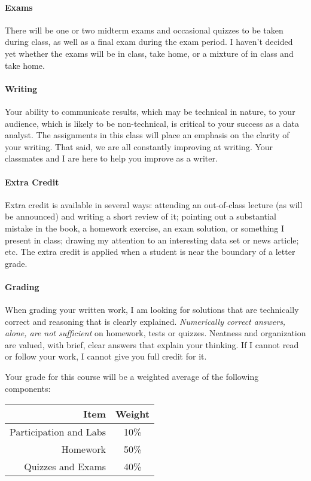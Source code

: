 \documentclass[11pt]{article}
\begin{document}
\paragraph{Exams}
There will be one or two midterm exams and occasional quizzes to be taken during class, as well as a final exam during the exam period.  I haven't decided yet whether the exams will be in class, take home, or a mixture of in class and take home.

\paragraph{Writing}
Your ability to communicate results, which may be technical in nature, to your audience, which is likely to be non-technical, is critical to your success as a data analyst. The assignments in this class will place an emphasis on the clarity of your writing.  That said, we are all constantly improving at writing.  Your classmates and I are here to help you improve as a writer.

\paragraph{Extra Credit}
Extra credit is available in several ways: attending an out-of-class lecture (as will be announced) and writing a short review of it; pointing out a substantial mistake in the book, a homework exercise, an exam solution, or something I present in class; drawing my attention to an interesting data set or news article; etc. The extra credit is applied when a student is near the boundary of a letter grade.

\paragraph{Grading}
When grading your written work, I am looking for solutions that are technically correct and reasoning that is clearly explained.  \emph{Numerically correct answers, alone, are not sufficient} on homework, tests or quizzes.  Neatness and organization are valued, with brief, clear answers that explain your thinking.  If I cannot read or follow your work, I cannot give you full credit for it.

Your grade for this course will be a weighted average of the following components:


\begin{table}[!h]
\centering
\begin{tabular}{r c}
\toprule
Item & Weight \\
\midrule
Participation and Labs & 10\% \\
\cmidrule(r){1-2}
Homework & 50\% \\
\cmidrule(r){1-2}
Quizzes and Exams & 40\% \\
\bottomrule
\end{tabular}
\end{table}
\end{document}
